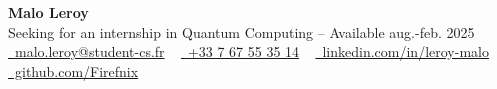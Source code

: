 \begin{center}
    {\Huge\bfseries\sffamily Malo Leroy}
    \\ Seeking for an internship in Quantum Computing -- Available aug.-feb. 2025 \\
    \small
    \href{mailto:malo.leroy@student-cs.fr}{\raisebox{-0.2\height}\faEnvelope\  malo.leroy@student-cs.fr} ~
    \href{tel:+33767553514}{\raisebox{-0.2\height}\faPhone\  {+33 7 67 55 35 14}} ~
    \href{https://linkedin.com/in/leroy-malo}{\raisebox{-0.2\height}\faLinkedin\ linkedin.com/in/leroy-malo}  ~
    \href{https://github.com/Firefnix}{\raisebox{-0.2\height}\faGithub\ github.com/Firefnix}
\end{center}
